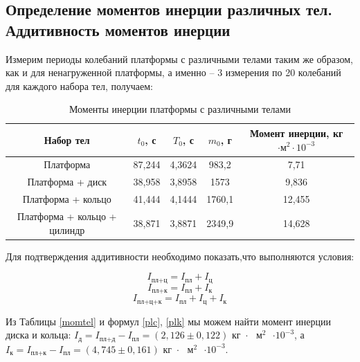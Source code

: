 \documentclass[a4paper,12pt]{article}
\begin{document}
	\subsection{Определение моментов инерции различных тел. Аддитивность моментов инерции}
	
	Измерим периоды колебаний платформы с различными телами таким же образом, как и для ненагруженной платформы, а именно -- 3 измерения по 20 колебаний для каждого набора тел, получаем:
	
	\begin{table}[!h]
		\begin{center}
			\begin{tabular}{|c|c|c|c|c|}
				\hline
				Набор тел & $t_0$, с & $T_0$, с & $m_0$, г & Момент инерции, кг$\cdot \text{м}^2 \cdot 10^{-3}$\\
				\hline
				Платформа& 87,244 & 4,3624 & 983,2 & 7,71\\
				\hline
				Платформа + диск  & 38,958 & 3,8958 & 1573 & 9,836  \\
				\hline
				Платформа + кольцо   & 41,444 & 4,1444 & 1760,1 & 12,455 \\
				\hline
				Платформа + кольцо + цилиндр &   38,871 & 3,8871 & 2349,9 & 14,628 \\
				\hline
			\end{tabular}
		\caption{Моменты инерции платформы с различными телами}
		\label{momtel}
		\end{center}
	\end{table}
	
	Для подтверждения аддитивности необходимо показать,что выполняются условия:
	
	
		\begin{equation} \label{plc}
			I_\text{пл+ц} = I_\text{пл} + I_\text{ц}
		\end{equation}
		\begin{equation}\label{plk}
			I_\text{пл+к} = I_\text{пл} + I_\text{к}
		\end{equation}
		\begin{equation}
			I_\text{пл+ц+к} = I_\text{пл} + I_\text{ц} + I_\text{к}
			\label{plck}
		\end{equation}
	
	
	Из Таблицы \eqref{momtel} и формул \eqref{plc}, \eqref{plk} мы можем найти момент инерции диска и кольца: $I_\text{д} = I_\text{пл+д} - I_\text{пл} = \left(2,126 \pm 0,122\right) \text{ кг $\cdot$ $\text{м}^2$ $\cdot 10^{-3}$}$, а $I_\text{к} = I_\text{пл+к} - I_\text{пл} = \left(4,745 \pm 0,161\right) \text{ кг $\cdot$ $\text{м}^2$ $\cdot 10^{-3}$}$. 
	
\end{document}
